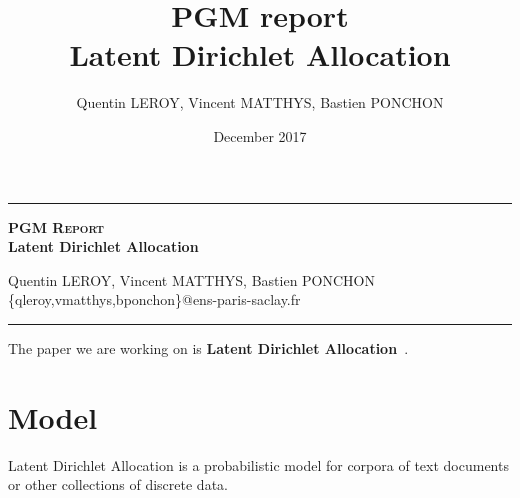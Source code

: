 \documentclass[12pt,a4paper,onecolumn]{article}
\title{PGM report \\ Latent Dirichlet Allocation}
\author{Quentin LEROY, Vincent MATTHYS, Bastien PONCHON}
\date{December 2017}
\begin{document}
\begin{center}

	\rule[11pt]{5cm}{0.5pt}

	\textbf{\Large \textsc{PGM Report} \\ Latent Dirichlet Allocation}
	\vspace{0.5cm}

	Quentin LEROY, Vincent MATTHYS, Bastien PONCHON\\
	\{qleroy,vmatthys,bponchon\}@ens-paris-saclay.fr

	\rule{5cm}{0.5pt}

\end{center}


The paper we are working on is \textbf{Latent Dirichlet Allocation}~\cite{lda_2003}.


\section{Model}


Latent Dirichlet Allocation is a probabilistic model for corpora of text documents or other collections of discrete data.
\end{document}
